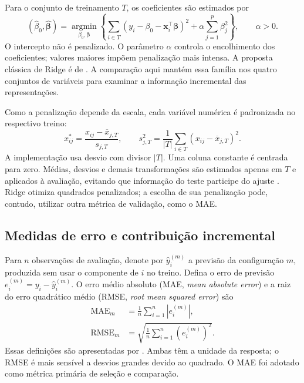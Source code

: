 Para o conjunto de treinamento $T$, os coeficientes são estimados por
\begin{equation}\label{eq:ridge}
 (\widehat\beta_0,\widehat{\bm\beta})=
 \underset{\beta_0,\bm\beta}{\operatorname{argmin}}
 \left\{\sum_{i\in T}(y_i-\beta_0-\bm x_i^\top\bm\beta)^2
 +\alpha\sum_{j=1}^{p}\beta_j^2\right\},\qquad\alpha>0.
\end{equation}
O intercepto não é penalizado. O parâmetro $\alpha$ controla o encolhimento dos coeficientes; valores maiores impõem penalização mais intensa. A proposta clássica de Ridge é de . A comparação aqui mantém essa família nos quatro conjuntos de variáveis para examinar a informação incremental das representações.

Como a penalização depende da escala, cada variável numérica é padronizada no respectivo treino:
\begin{equation}\label{eq:padronizacao}
 x_{ij}^{*}=\frac{x_{ij}-\overline x_{j,T}}{s_{j,T}},\qquad
 s_{j,T}^2=\frac{1}{|T|}\sum_{i\in T}(x_{ij}-\overline x_{j,T})^2.
\end{equation}
A implementação usa desvio com divisor $|T|$. Uma coluna constante é centrada para zero. Médias, desvios e demais transformações são estimados apenas em $T$ e aplicados à avaliação, evitando que informação do teste participe do ajuste \cite{james2023}. Ridge otimiza quadrados penalizados; a escolha de sua penalização pode, contudo, utilizar outra métrica de validação, como o MAE.

\subsection{Medidas de erro e contribuição incremental}
Para $n$ observações de avaliação, denote por $\widehat y_i^{(m)}$ a previsão da configuração $m$, produzida sem usar o componente de $i$ no treino. Defina o erro de previsão $e_i^{(m)}=y_i-\widehat y_i^{(m)}$. O erro médio absoluto (MAE, \textit{mean absolute error}) e a raiz do erro quadrático médio (RMSE, \textit{root mean squared error}) são
\begin{align}
 \operatorname{MAE}_m&=\frac{1}{n}\sum_{i=1}^{n}|e_i^{(m)}|,\label{eq:mae}\\
 \operatorname{RMSE}_m&=\sqrt{\frac{1}{n}\sum_{i=1}^{n}(e_i^{(m)})^2}.\label{eq:rmse}
\end{align}
Essas definições são apresentadas por . Ambas têm a unidade da resposta; o RMSE é mais sensível a desvios grandes devido ao quadrado. O MAE foi adotado como métrica primária de seleção e comparação.

